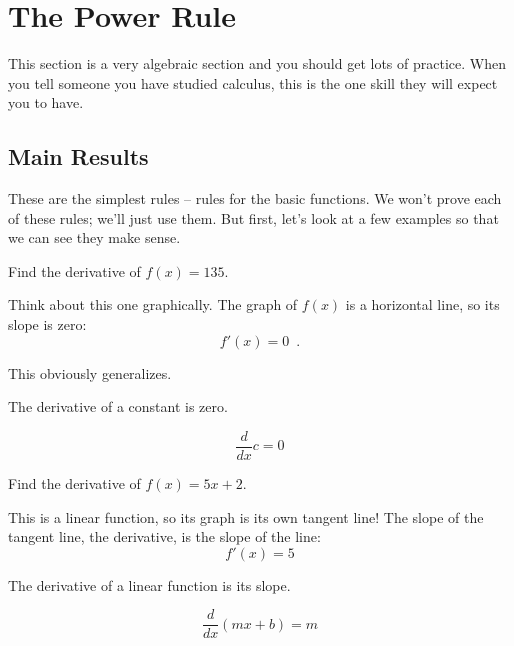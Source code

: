\section{The Power Rule}
\label{sec:power}

This section is a very algebraic section and you should get lots of practice. When you tell someone you have studied calculus, this is the one skill they will expect you to have.

\subsection{Main Results}
These are the simplest rules -- rules for the basic functions. We won't prove each of these rules; we'll just use them. But first, let's look at a few examples so that we can see they make sense.

\begin{example}
Find the derivative of $f(x)=135.$

\begin{solution} Think about this one graphically. The graph of $f(x)$ is a horizontal line, so its slope is zero:
$$f'(x)=0 \enspace .$$
\end{solution}\end{example}
This obviously generalizes.
\begin{theorem}
The derivative of a constant is zero.

$$\dfrac{d}{dx}c = 0$$
\end{theorem}

\begin{example}
Find the derivative of $f(x)=5x+2$.

\begin{solution} This is a linear function, so its graph is its own tangent line! The slope of the tangent line, the derivative, is the slope of the line:
$$f'(x)=5$$
\end{solution}\end{example}

\begin{theorem}
The derivative of a linear function is its slope.

$$\dfrac{d}{dx}(mx+b) = m$$
\end{theorem}

